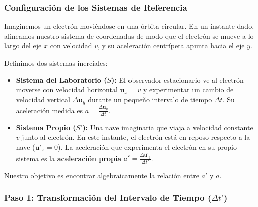 \documentclass[11pt,a4paper]{book}
\begin{document}
\subsubsection{Configuración de los Sistemas de Referencia}

Imaginemos un electrón moviéndose en una órbita circular. En un instante dado, alineamos nuestro sistema de coordenadas de modo que el electrón se mueve a lo largo del eje $x$ con velocidad $v$, y su aceleración centrípeta apunta hacia el eje $y$.

Definimos dos sistemas inerciales:
\begin{itemize}
    \item \textbf{Sistema del Laboratorio ($S$):} El observador estacionario ve al electrón moverse con velocidad horizontal $\boldsymbol{u}_x = v$ y experimentar un cambio de velocidad vertical $\Delta \boldsymbol{u}_y$ durante un pequeño intervalo de tiempo $\Delta t$. Su aceleración medida es $a = \frac{\Delta \boldsymbol{u}_y}{\Delta t}$.
    \item \textbf{Sistema Propio ($S'$):} Una nave imaginaria que viaja a velocidad constante $v$ junto al electrón. En este instante, el electrón está en reposo respecto a la nave ($\boldsymbol{u}'_x = 0$). La aceleración que experimenta el electrón en su propio sistema es la \textbf{aceleración propia} $a' = \frac{\Delta \boldsymbol{u}'_y}{\Delta t'}$.
\end{itemize}

Nuestro objetivo es encontrar algebraicamente la relación entre $a'$ y $a$.

\subsubsection{Paso 1: Transformación del Intervalo de Tiempo ($\Delta t'$)}
\end{document}
